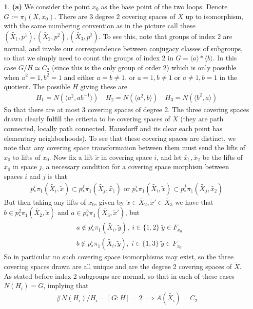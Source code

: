 \documentclass[10.5pt]{article}
\theoremstyle{definition}
\newtheorem{pb}{}
\newcommand{\set}[1]{\{#1\}}
\newcommand{\gen}[1]{\langle #1 \rangle}
\newcommand{\tand}{\text{ and }}
\newcommand{\tor}{\text{ or }}
\begin{document}
    \begin{pb}
        \textbf{(a)} We consider the point \(x_0\) as the base point of the two loops. 
        Denote \(G := \pi_1(X,x_0)\). There are 3 degree 2 covering spaces of \(X\) up to isomorphism, with the same numbering convention as in the picture call these \((\tilde{X_1},p^1),(\tilde{X_2},p^2),(\tilde{X_3},p^3)\). To see this, note that groups of index 2 are normal, and invoke our correspondence between conjugacy classes of subgroups, so that we simply need to count the groups of index \(2\) in \(G = \gen{a}*\gen{b}\). In this case \(G/H \simeq C_2\) (since this is the only group of order 2) which is only possible when \(a^2 = 1, b^2 = 1\) and either \(a = b \neq 1\), or \(a = 1, b \neq 1\) or \(a \neq 1, b = 1\) in the quotient. The possible \(H\) giving these are
        \begin{align*}
            H_1 = N(\gen{a^2,ab^{-1}}) \quad H_2 = N(\gen{a^2,b}) \quad H_3 = N(\gen{b^2,a})
        \end{align*}
        So that there are at most 3 covering spaces of degree 2. The three covering spaces drawn clearly fulfill the criteria to be covering spaces of \(X\) (they are path connected, locally path connected, Hausdorff and its clear each point has elementary neighborhoods). To see that these covering spaces are distinct, we note that any covering space transformation between them must send the lifts of \(x_0\) to lifts of \(x_0\). Now fix a lift \(\tilde{x}\) in covering space \(i\), and let \(\tilde{x_1}, \tilde{x_2}\) be the lifts of \(x_0\) in space \(j\), a necessary condition for a covering space morphism between spaces \(i\) and \(j\) is that
        \begin{align*}
            p^i_*\pi_1(\tilde{X_i},\tilde{x}) \subset p^j_*\pi_1(\tilde{X_j},\tilde{x_1}) \tor p^i_*\pi_1(\tilde{X_i},\tilde{x}) \subset p^j_*\pi_1(\tilde{X_j},\tilde{x_2})
        \end{align*}
        But then taking any lifts of \(x_0\), given by \(\tilde{x} \in \tilde{X_2}, \tilde{x}' \in \tilde{X_3}\) we have that \(b \in p^2_*\pi_1(\tilde{X_2},\tilde{x}) \tand a \in p^3_*\pi_1(\tilde{X_3},\tilde{x}')\), but
        \begin{align*}
            &a \not \in p^i_*\pi_1(\tilde{X_i},\tilde{y}), \; i \in \set{1,2} \; \tilde{y} \in F_{x_0} \\
            &b \not \in p^i_*\pi_1(\tilde{X_i},\tilde{y}), \; i \in \set{1,3} \; \tilde{y} \in F_{x_0}
        \end{align*}
        So in particular no such covering space isomorphisms may exist, so the three covering spaces drawn are all unique and are the degree 2 covering spaces of \(\tilde{X}\). As stated before index 2 subgroups are normal, so that in each of these cases \(N(H_i) = G\), implying that
        \begin{align*}
            \# N(H_i)/H_i = [G:H] = 2 \implies A(\tilde{X_i}) = C_2
        \end{align*}


\end{pb}
\end{document}
